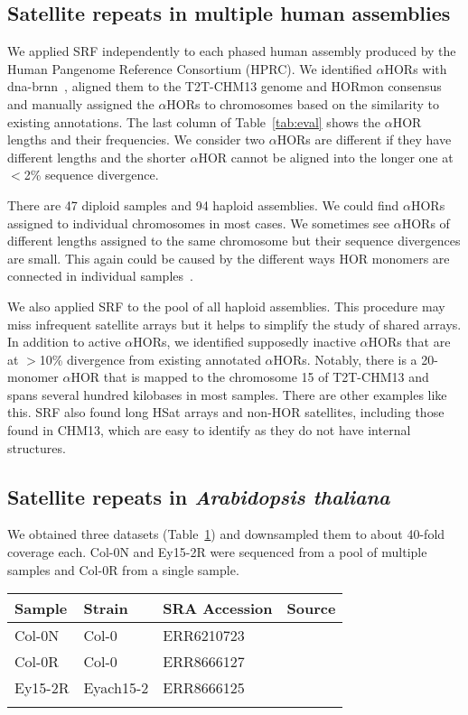 \documentclass{bioinfo}
\begin{document}
\subsection{Satellite repeats in multiple human assemblies}

We applied SRF independently to each phased human assembly produced by the
Human Pangenome Reference Consortium (HPRC). We identified $\alpha$HORs
with dna-brnn~\citep{Li:2019aa}, aligned them to the T2T-CHM13 genome and
HORmon consensus and manually assigned the $\alpha$HORs to chromosomes based on
the similarity to existing annotations. The last column of Table~\ref{tab:eval}
shows the $\alpha$HOR lengths and their frequencies. We consider two
$\alpha$HORs are different if they have different lengths and the shorter
$\alpha$HOR cannot be aligned into the longer one at $<$2\% sequence
divergence.

There are 47 diploid samples and 94 haploid assemblies. We could find
$\alpha$HORs assigned to individual chromosomes in most cases. We sometimes see
$\alpha$HORs of different lengths assigned to the same chromosome but their
sequence divergences are small. This again could be caused by the different
ways HOR monomers are connected in individual
samples~\citep{Logsdon:2021aa,Kunyavskaya:2022tx}.

We also applied SRF to the pool of all haploid assemblies. This procedure
may miss infrequent satellite arrays but it helps to simplify the study of
shared arrays. In addition to active $\alpha$HORs, we identified supposedly
inactive $\alpha$HORs that are at $>$10\% divergence from existing annotated
$\alpha$HORs. Notably, there is a 20-monomer $\alpha$HOR that is mapped to
the chromosome 15 of T2T-CHM13 and spans several hundred kilobases in most
samples. There are other examples like this. SRF also found long HSat
arrays and non-HOR satellites, including those found in CHM13, which are easy
to identify as they do not have internal structures.

\subsection{Satellite repeats in \emph{Arabidopsis thaliana}}

We obtained three datasets (Table~\ref{tab:at}) and downsampled them to about
40-fold coverage each. Col-0N and Ey15-2R were sequenced from a pool of
multiple samples and Col-0R from a single sample.

\begin{table}[!hb]
{\label{tab:at}
\begin{tabular}{p{1.5cm}p{1.5cm}ll}
\toprule
Sample & Strain & SRA Accession & Source \\
\midrule
Col-0N & Col-0 & ERR6210723 & \citet{Naish:2021aa} \\
Col-0R & Col-0 & ERR8666127 & \citet{Rabanal:2022aa} \\
Ey15-2R & Eyach15-2 & ERR8666125 & \citet{Rabanal:2022aa} \\
\botrule
\end{tabular}}{}
\end{table}
\end{document}
